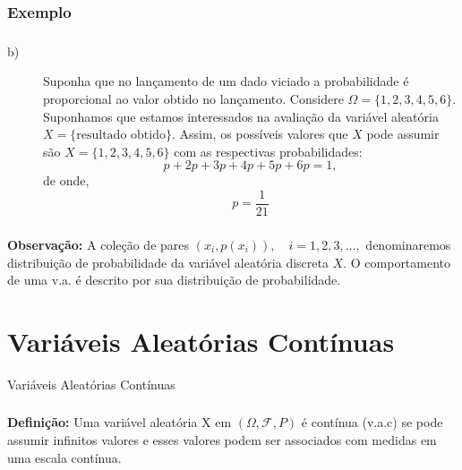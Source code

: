 \documentclass[14pt,aspectratio=1610]{beamer}
\begin{document}
\begin{frame}{}
\frametitle{Exemplo}
\begin{block}{}
\justifying
{}
\end{block}
\end{frame}

\begin{frame}{}
\frametitle{}
\small
\begin{block}{}
\justifying
\begin{description}
\item[b)] \justifying Suponha que no lançamento de um dado viciado a probabilidade é proporcional ao valor obtido no lançamento. Considere $\Omega=\{1,2,3,4,5,6\}.$ Suponhamos que estamos interessados na avaliação da variável aleatória $X=\{\textrm{resultado obtido}\}.$ Assim, os possíveis valores que $X$ pode assumir são $X=\{1,2,3,4,5,6\}$ com as respectivas probabilidades: $$p+2p+3p+4p+5p+6p=1,$$ de onde, $$p=\dfrac{1}{21}$$
\end{description}
\end{block}
\end{frame}

\begin{frame}{}
\frametitle{}
\begin{block}{}
\justifying
\textbf{Observação:} A coleção de pares $(x_{i}, p(x_{i})),\quad i=1,2,3,\ldots,$ de\-no\-mi\-na\-re\-mos distribuição de probabilidade da variável aleatória discreta $X.$ 
O comportamento de uma v.a. é descrito por sua distribuição de probabilidade.
\end{block}
\end{frame}

\section{Variáveis Aleatórias Contínuas}
\begin{frame}{Variáveis Aleatórias Contínuas}
\frametitle{}
\begin{block}{}
\justifying
\textbf{Definição:} Uma variável aleatória X em $(\Omega, \mathcal{F},P)$ é contínua (v.a.c) se pode assumir infinitos valores e esses valores podem ser associados com medidas em uma escala contínua.
\end{block}
\end{frame}
\end{document}
